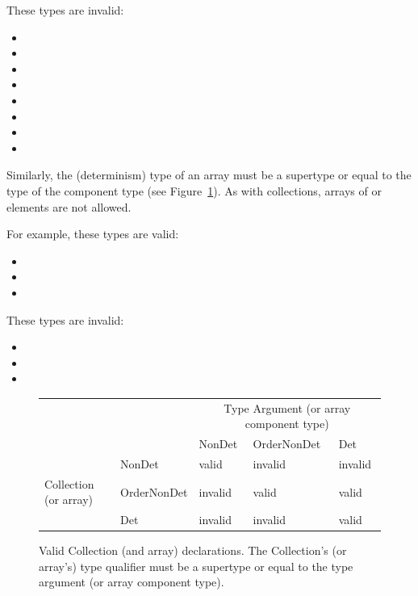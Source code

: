 These types are invalid:
\begin{itemize}
	\item {}
	\item {}
	\item {}
	\item {}
	\item {}
	\item {}
	\item {}
	\item {}
\end{itemize}

Similarly, the (determinism) type of an array must be a supertype or equal to
the type of the component type (see Figure~\ref{fig-determinism-collections}).
As with collections,  arrays of  or 
elements are not allowed.

For example, these types are valid:
\begin{itemize}
	\item {}
	\item {}
	\item {}
\end{itemize}

These types are invalid:
\begin{itemize}
	\item {}
	\item {}
	\item {}
\end{itemize}

\begin{figure}
	\centering
	\begin{tabular}{|l|l|l|l|l|}
		\cline{3-5}
		\multicolumn{2}{c|}{~}  &  \multicolumn{3}{c|}{Type Argument (or array component type)} \\ \cline{3-5}
		\multicolumn{2}{c|}{~}  & NonDet     & OrderNonDet & Det \\ \hline
		& NonDet      &   valid    &  invalid    & invalid  \\ \cline{2-5}
		Collection (or array)   & OrderNonDet &   invalid  &  valid      & valid  \\ \cline{2-5}
		& Det         &   invalid  &  invalid    & valid      \\ \hline
	\end{tabular}
	\caption{Valid Collection (and array) declarations.  The Collection's (or array's) type qualifier
		must be a supertype or equal to the type argument (or array component type).}
	\label{fig-determinism-collections}
\end{figure}

